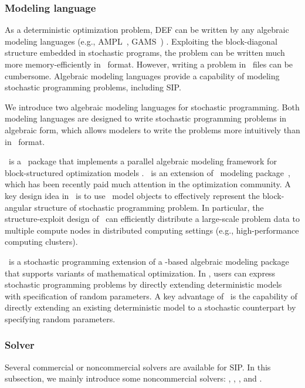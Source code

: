 \subsubsection{Modeling language}

As a deterministic optimization problem, DEF can be written by any algebraic modeling languages (e.g., AMPL~\cite{web:AMPL}, GAMS~\cite{web:GAMS}) . Exploiting the block-diagonal structure embedded in stochastic programs, the problem can be written much more memory-efficiently in \smps\ format. However, writing a problem in \smps\ files can be cumbersome. Algebraic modeling languages provide a capability of modeling stochastic programming problems, including SIP.

We introduce two algebraic modeling languages for stochastic programming. Both modeling languages are designed to write stochastic programming problems in algebraic form, which allows modelers to write the problems more intuitively than in \smps\ format.

\structjump\ is a \julia\ package that implements a parallel algebraic modeling framework for block-structured optimization models \cite{web:StructJuMP}. \structjump\ is an extension of \jump\ modeling package~\cite{journal:JuMP}, which has been recently paid much attention in the optimization community. A key design idea in \structjump\ is to use \jump\ model objects to effectively represent the block-angular structure of stochastic programming problem. In particular, the structure-exploit design of \structjump\ can efficiently distribute a large-scale problem data to multiple compute nodes in distributed computing settings (e.g., high-performance computing clusters).

\pysp\ is a stochastic programming extension of a \python-based algebraic modeling package \pyomo\ \cite{book:pyomo} that supports variants of mathematical optimization. In \pysp, users can express stochastic programming problems by directly extending deterministic models with specification of random parameters. A key advantage of \pysp\ is the capability of directly extending an existing deterministic model to a stochastic counterpart by specifying random parameters. 

\subsubsection{Solver}
Several commercial or noncommercial solvers are available for SIP. In this subsection, we mainly introduce some noncommercial solvers: \pipssbb, \scip, \dsp, and \pysp.

